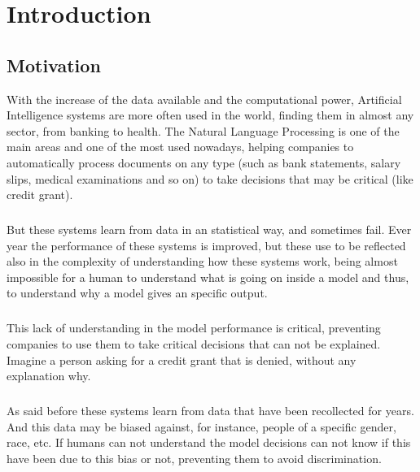 
\chapter{Introduction}
\label{ch:Introduction}

\section{Motivation}
\label{sec:Motivation}
\noindent With the increase of the data available and the computational power, Artificial Intelligence systems are more often used in the world, finding them in almost any sector, from banking to health. The Natural Language Processing is one of the main areas and one of the most used nowadays, helping companies to automatically process documents on any type (such as bank statements, salary slips, medical examinations and so on) to take decisions that may be critical (like credit grant).
\paragraph{}
But these systems learn from data in an statistical way, and sometimes fail. Ever year the performance of these systems is improved, but these use to be reflected also in the complexity of understanding how these systems work, being almost impossible for a human to understand what is going on inside a model and thus, to understand why a model gives an specific output.
\paragraph{}
This lack of understanding in the model performance is critical, preventing companies to use them to take critical decisions that can not be explained. Imagine a person asking for a credit grant that is denied, without any explanation why.
\paragraph{}
As said before these systems learn from data that have been recollected for years. And this data may be biased against, for instance, people of a specific gender, race, etc. If humans can not understand the model decisions can not know if this have been due to this bias or not, preventing them to avoid discrimination.
